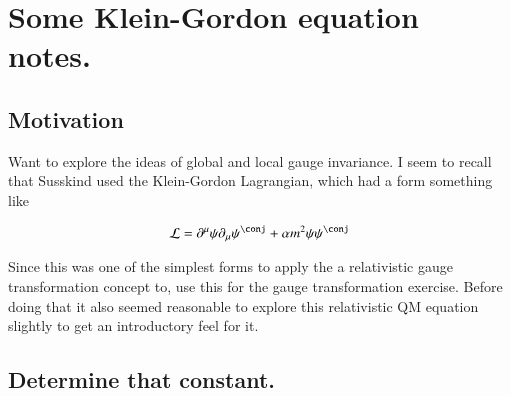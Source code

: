 
%
%




\chapter{Some Klein-Gordon equation notes. }
\date{ March 27, 2009.  $RCSfile: kleinGordon.tex,v $ Last $Revision: 1.18 $ $Date: 2009/06/11 17:00:37 $ }

%

\section{Motivation }

Want to explore the ideas of global and local gauge invariance.  I seem to recall that Susskind
used the Klein-Gordon Lagrangian, which had a form something like

\begin{align}\label{eqn:klein_gordon:densityUndeterminedCoeff}
\LL = \partial^\mu \psi \partial_\mu \psi^\conj + \alpha m^2 \psi \psi^\conj
\end{align}

Since this was one of the simplest forms to apply the
a relativistic gauge transformation concept to, use this for the gauge transformation exercise.  Before doing that it also seemed reasonable to
explore this relativistic QM equation slightly to get an introductory feel for it.

\section{Determine that constant. }

